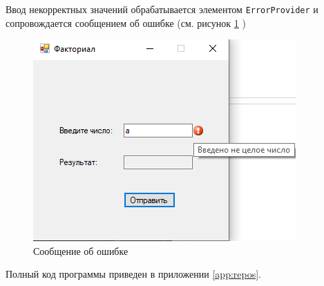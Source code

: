 Ввод некорректных значений обрабатывается элементом \verb|ErrorProvider| и 
сопровождается сообщением об ошибке (см. рисунок \ref{fig:error1} )
\begin{figure}[H]
    \centering
    \includegraphics{task1/error.png}
    \caption{Сообщение об ошибке}
    \label{fig:error1}
\end{figure}
Полный код программы приведен в приложении \ref{app:repos}.